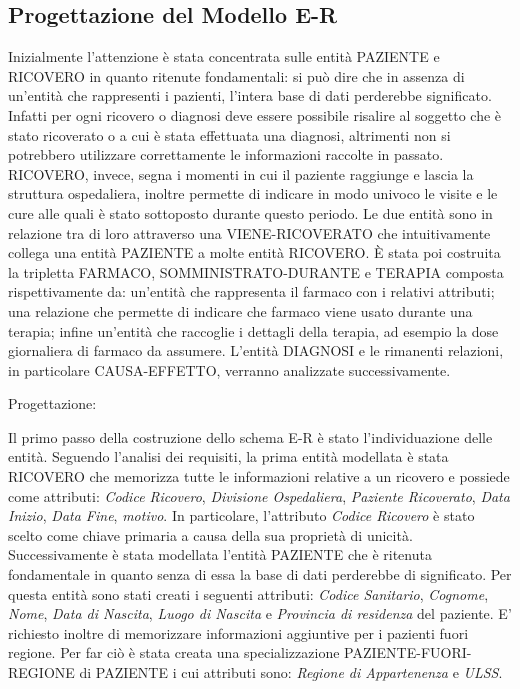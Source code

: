 \documentclass{article}
\begin{document}
\clearpage
\subsection{Progettazione del Modello E-R}
Inizialmente l'attenzione è stata concentrata sulle entità PAZIENTE e RICOVERO
in quanto ritenute fondamentali: si può dire che in assenza di un'entità che
rappresenti i pazienti, l'intera base di dati perderebbe significato.  Infatti
per ogni ricovero o diagnosi deve essere possibile risalire al soggetto che è
stato ricoverato o a cui è stata effettuata una diagnosi, altrimenti non si
potrebbero utilizzare correttamente le informazioni raccolte in passato.
RICOVERO, invece, segna i momenti in cui il paziente raggiunge e lascia la
struttura ospedaliera, inoltre permette di indicare in modo univoco le visite e
le cure alle quali è stato sottoposto durante questo periodo.  Le due entità
sono in relazione tra di loro attraverso una VIENE-RICOVERATO che intuitivamente
collega una entità PAZIENTE a molte entità RICOVERO.  È stata poi costruita la
tripletta FARMACO, SOMMINISTRATO-DURANTE e TERAPIA composta rispettivamente da:
un'entità che rappresenta il farmaco con i relativi attributi; una relazione che
permette di indicare che farmaco viene usato durante una terapia; infine
un'entità che raccoglie i dettagli della terapia, ad esempio la dose giornaliera
di farmaco da assumere.  L'entità DIAGNOSI e le rimanenti relazioni, in
particolare CAUSA-EFFETTO, verranno analizzate successivamente.










Progettazione:

Il primo passo della costruzione dello schema E-R è stato l'individuazione
delle entità. Seguendo l'analisi dei requisiti, la prima entità modellata è 
stata RICOVERO che memorizza tutte le informazioni relative a un ricovero e
possiede come attributi: \textit{Codice Ricovero}, \textit{Divisione 
Ospedaliera}, \textit{Paziente Ricoverato}, \textit{Data Inizio}, \textit{Data
Fine}, \textit{motivo}. In particolare, l'attributo \textit{Codice Ricovero} 
è stato scelto come chiave primaria a causa della sua proprietà di unicità. 
Successivamente è stata modellata l'entità PAZIENTE che è ritenuta fondamentale 
in quanto senza di essa la base di dati perderebbe di significato. Per questa 
entità sono stati creati i seguenti attributi: \textit{Codice Sanitario}, 
\textit{Cognome}, \textit{Nome}, \textit{Data di Nascita}, \textit{Luogo di 
Nascita} e \textit{Provincia di residenza} del paziente. E' richiesto inoltre 
di memorizzare informazioni aggiuntive per i pazienti fuori regione. Per far 
ciò è stata creata una specializzazione PAZIENTE-FUORI-REGIONE di PAZIENTE 
i cui attributi sono: \textit{Regione di Appartenenza} e \textit{ULSS}.
\end{document}
